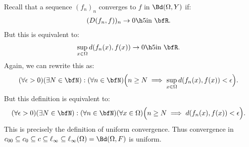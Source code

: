     \begin{example}
        Recall that a sequence $(f_n)_n$ converges to $f$ in $\Bd(\Omega,Y)$ if:
            \begin{equation*}
            \begin{split}
                (D(f_n,f))_n \rightarrow 0 \h5\text{in $\bfR$}.
            \end{split}
            \end{equation*}
        But this is equivalent to:
            \begin{equation*}
            \begin{split}
                \sup_{x \in \Omega}d(f_n(x),f(x)) \rightarrow 0 \h5\text{in $\bfR$}.
            \end{split}
            \end{equation*}
        Again, we can rewrite this as:
            \begin{equation*}
            \begin{split}
                (\forall \epsilon > 0)(\exists N \in \bfN):(\forall n \in \bfN)\Bigl(n\geq N \implies \sup_{x \in \Omega}d(f_n(x),f(x))<\epsilon\Bigr).
            \end{split}
            \end{equation*}
        But this definition is equivalent to:
            \begin{equation*}
            \begin{split}
                (\forall \epsilon > 0)(\exists N \in \bfN):(\forall n \in \bfN)(\forall x\in \Omega)\Bigl(n\geq N \implies d(f_n(x),f(x))<\epsilon\Bigr).
            \end{split}
            \end{equation*}
        This is precisely the definition of uniform convergence. Thus convergence in $c_{00} \subseteq c_0 \subseteq c \subseteq \ell_\infty \subseteq \ell_\infty(\Omega) = \Bd(\Omega,F)$ is uniform.
    \end{example}

